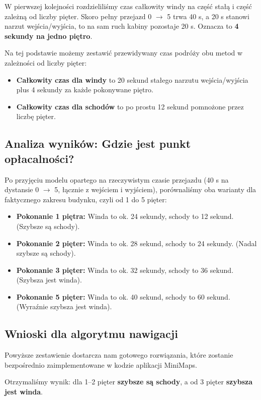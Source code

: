 \documentclass{article}
\begin{document}
W pierwszej kolejności rozdzieliliśmy czas całkowity windy na część stałą i część zależną od liczby pięter. Skoro pełny przejazd 0 $\rightarrow$ 5 trwa 40 s, a 20 s stanowi narzut wejścia/wyjścia, to na sam ruch kabiny pozostaje 20 s. Oznacza to \textbf{4 sekundy na jedno piętro}.

Na tej podstawie możemy zestawić przewidywany czas podróży obu metod w zależności od liczby pięter:
\begin{itemize}
    \item \textbf{Całkowity czas dla windy} to 20 sekund stałego narzutu wejścia/wyjścia plus 4 sekundy za każde pokonywane piętro.
    \item \textbf{Całkowity czas dla schodów} to po prostu 12 sekund pomnożone przez liczbę pięter.
\end{itemize}

\subsection{Analiza wyników: Gdzie jest punkt opłacalności?}
Po przyjęciu modelu opartego na rzeczywistym czasie przejazdu (40 s na dystansie 0 $\rightarrow$ 5, łącznie z wejściem i wyjściem), porównaliśmy oba warianty dla faktycznego zakresu budynku, czyli od 1 do 5 pięter:

\begin{itemize}
    \item \textbf{Pokonanie 1 piętra:} Winda to ok. 24 sekundy, schody to 12 sekund. (Szybsze są schody).
    \item \textbf{Pokonanie 2 pięter:} Winda to ok. 28 sekund, schody to 24 sekundy. (Nadal szybsze są schody).
    \item \textbf{Pokonanie 3 pięter:} Winda to ok. 32 sekundy, schody to 36 sekund. (Szybsza jest winda).
    \item \textbf{Pokonanie 5 pięter:} Winda to ok. 40 sekund, schody to 60 sekund. (Wyraźnie szybsza jest winda).
\end{itemize}

\subsection{Wnioski dla algorytmu nawigacji}
Powyższe zestawienie dostarcza nam gotowego rozwiązania, które zostanie bezpośrednio zaimplementowane w kodzie aplikacji MiniMaps. 

Otrzymaliśmy wynik: dla 1--2 pięter \textbf{szybsze są schody}, a od 3 pięter \textbf{szybsza jest winda}. 
\end{document}
